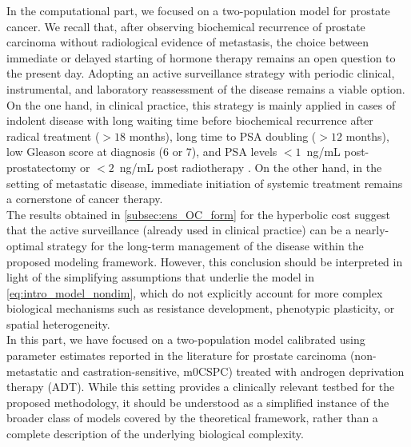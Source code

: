 \documentclass[a4paper,12pt, reqno]{amsart}
\theoremstyle{plain}
\theoremstyle{definition}
\theoremstyle{remark}
\numberwithin{equation}{section}
\begin{document}
In the computational part, we focused on a two-population model for prostate cancer. We recall that, after observing biochemical recurrence of prostate carcinoma without radiological evidence of metastasis, the choice between immediate or delayed starting of hormone therapy remains an open question to the present day.
Adopting an active surveillance strategy with periodic clinical, instrumental, and laboratory reassessment of the disease remains a viable option. On the one hand, in clinical practice, this strategy is mainly applied in cases of indolent disease with long waiting time before biochemical recurrence after radical treatment ($>18$ months), long time to PSA doubling ($>12$ months), low Gleason score at diagnosis ($6$ or $7$), and PSA levels $<1$~ng/mL post-prostatectomy or $<2$~ng/mL post radiotherapy \cite{preisser2024european,karim2025early}.
On the other hand, in the setting of metastatic disease, immediate initiation of systemic treatment remains a cornerstone of cancer therapy.\\
The results obtained in \cref{subsec:ens_OC_form} for the hyperbolic cost suggest that the active surveillance (already used in clinical practice) can be a nearly-optimal strategy for the long-term management of the disease {within the proposed modeling framework. However, this conclusion should be interpreted in light of the simplifying assumptions that underlie the model in \cref{eq:intro_model_nondim}, which do not explicitly account for more complex biological mechanisms such as resistance development, phenotypic plasticity, or spatial heterogeneity.}\\
{In this part, we have focused on a two-population model calibrated using parameter estimates reported in the literature for prostate carcinoma (non-metastatic and castration-sensitive, m0CSPC) treated with androgen deprivation therapy (ADT). While this setting provides a clinically relevant testbed for the proposed methodology, it should be understood as a simplified instance of the broader class of models covered by the theoretical framework, rather than a complete description of the underlying biological complexity.}
\end{document}
